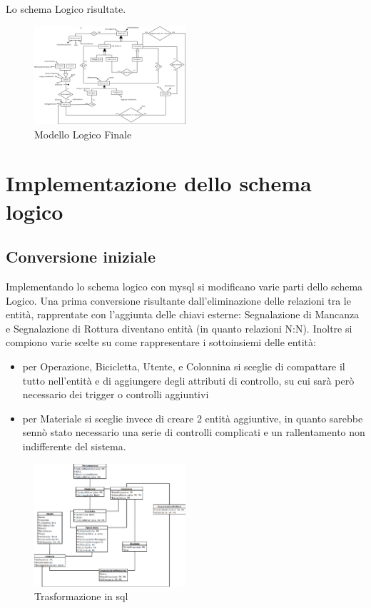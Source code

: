 \documentclass[a4paper,twoside]{article}
\begin{document}
Lo schema Logico risultate.
\begin{figure}[H]
 \centering
  \includegraphics[width=0.5\textwidth]{Immagini-Grafici/LogicoFinale.png}
\caption{Modello Logico Finale}
\end{figure}
\section{Implementazione dello schema logico}
\subsection{Conversione iniziale}
Implementando lo schema logico con mysql si modificano varie parti dello schema Logico.\newline
Una prima conversione risultante dall'eliminazione delle relazioni tra le entità, rapprentate con l'aggiunta delle chiavi esterne: Segnalazione di Mancanza e Segnalazione di Rottura diventano entità (in quanto relazioni N:N).\newline
Inoltre si compiono varie scelte su come rappresentare i sottoinsiemi delle entità:
\begin{itemize}
 \item per Operazione, Bicicletta, Utente, e Colonnina si sceglie di compattare il tutto nell'entità e di aggiungere degli attributi di controllo, su cui sarà però necessario dei trigger o controlli aggiuntivi
 \item per Materiale si sceglie invece di creare 2 entità aggiuntive, in quanto sarebbe sennò stato necessario una serie di controlli complicati e un rallentamento non indifferente del sistema.
\end{itemize}
\begin{figure}[H]
 \centering
  \includegraphics[width=0.5\textwidth]{Immagini-Grafici/SQL.png}
\caption{Trasformazione in sql}
\end{figure}
\end{document}
